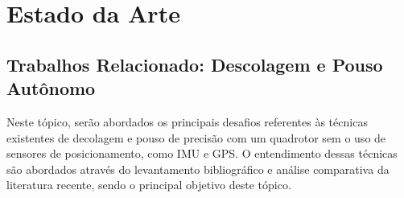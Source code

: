 
\section{Estado da Arte}





\subsection{Trabalhos Relacionado: Descolagem e Pouso Autônomo}



	
	Neste tópico, serão abordados os principais desafios referentes às técnicas existentes de decolagem e pouso de precisão com um quadrotor sem o uso de sensores de posicionamento, como IMU e GPS. O entendimento dessas técnicas são abordados através do levantamento bibliográfico e análise comparativa da literatura recente, sendo o principal objetivo deste tópico.

